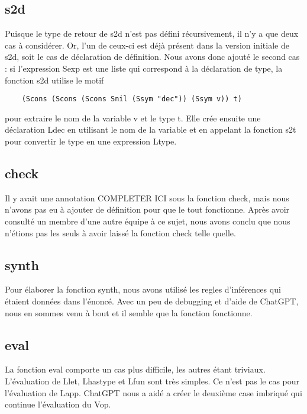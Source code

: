 \documentclass{article}
\begin{document}
\subsection{s2d}
Puisque le type de retour de s2d n'est pas défini récursivement, il n'y a que deux cas à considérer. Or, l'un de ceux-ci est déjà présent dans la version initiale de s2d, soit le cas de déclaration de définition. Nous avons donc ajouté le second cas : si l'expression Sexp est une liste qui correspond à la déclaration de type, la fonction s2d utilise le motif
\begin{verbatim}
    (Scons (Scons (Scons Snil (Ssym "dec")) (Ssym v)) t)
\end{verbatim}
pour extraire le nom de la variable v et le type t. Elle crée ensuite une déclaration Ldec en utilisant le nom de la variable et en appelant la fonction s2t pour convertir le type en une expression Ltype.

\subsection{check}

Il y avait une annotation COMPLETER ICI sous la fonction check, mais nous n'avons pas eu à ajouter de définition pour que le tout fonctionne. Après avoir consulté un membre d'une autre équipe à ce sujet, nous avons conclu que nous n'étions pas les seuls à avoir laissé la fonction check telle quelle.

\subsection{synth}

Pour élaborer la fonction synth, nous avons utilisé les regles d'inférences qui étaient données dans l'énoncé. Avec un peu de debugging et d'aide de ChatGPT, nous en sommes venu à bout et il semble que la fonction fonctionne. 

\subsection{eval}

La fonction eval comporte un cas plus difficile, les autres étant triviaux. 
L'évaluation de Llet, Lhastype et Lfun sont très simples. Ce n'est pas le cas pour l'évaluation de Lapp. ChatGPT nous a aidé a créer le deuxième case imbriqué qui continue l'évaluation du Vop. 
\end{document}
